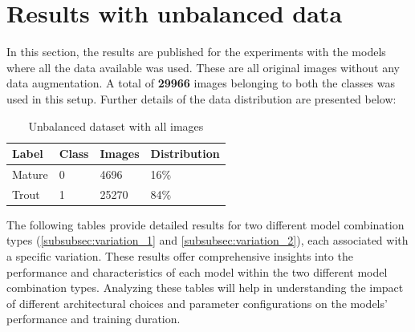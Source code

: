 
\section{Results with unbalanced data}

In this section, the results are published for the experiments with the models where all the data available was used. These are all original images without any data augmentation. A total of \textbf{29966} images belonging to both the classes was used in this setup. Further details of the data distribution are presented below:

\begin{table}[H]
\centering
\begin{tabularx}{\textwidth}{@{} *4{X} @{}}
\toprule
\textbf{Label} & \textbf{Class} & \textbf{Images} & \textbf{Distribution}\\
\midrule
    Mature     & 0 & 4696 & 16\%  \\[1.3ex]
    Trout    &  1 & 25270 & 84\% \\[1.3ex]
\bottomrule
\end{tabularx}
\caption{Unbalanced dataset with all images}
\label{table:data_type1}
\end{table}


The following tables provide detailed results for two different model combination types (\ref{subsubsec:variation_1} and \ref{subsubsec:variation_2}), each associated with a specific variation. These results offer comprehensive insights into the performance and characteristics of each model within the two different model combination types. Analyzing these tables will help in understanding the impact of different architectural choices and parameter configurations on the models' performance and training duration. 

